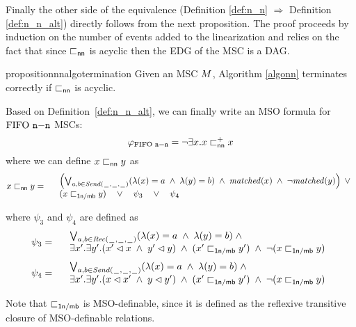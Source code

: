 Finally  the other side of the equivalence (Definition \ref{def:n_n} $\Rightarrow$ Definition \ref{def:n_n_alt}) directly follows from the next proposition. The proof  proceeds by induction on the number of events added to the linearization and relies on the fact that since $\sqsubset_{\mathsf{nn}}$ is acyclic then the EDG of the MSC is a DAG.

\begin{restatable}{proposition}{nnalgotermination}
\label{prop:nn_algo_term}
	Given an MSC $M$, Algorithm \ref{algonn}  terminates correctly if $\sqsubset_{\mathsf{nn}}$ is acyclic.
\end{restatable}

Based on Definition~\ref{def:n_n_alt}, we can finally write an MSO formula for $\text{FIFO } \mathtt{n\mathsf{-}n}$ MSCs:
\[
	\varphi_{\text{FIFO } \mathtt{n\mathsf{-}n}} = \neg \exists x. x \sqsubset_{\mathsf{nn}}^{+} x 
\]
where we can define $x \sqsubset_{\mathsf{nn}} y$ as
\[
	x \sqsubset_{\mathsf{nn}} y =
	\begin{array}{rl}
	& \left(
		\bigvee_{\substack{a,b \in {\mathit{Send}(\hspace{0.1em}\underline{\hspace{0.5em}}\hspace{0.1em},\hspace{0.1em}\underline{\hspace{0.5em}}\hspace{0.1em},\hspace{0.1em}\underline{\hspace{0.5em}}\hspace{0.1em})}}}
		(\lambda(x) = a \;\wedge\; \lambda(y) = b)
		\;\wedge\; \mathit{matched}(x) \;\wedge\; \neg \mathit{matched}(y)
	\right) \;\vee\\
	& (x \sqsubset_{\mathsf{1n/\mathsf{mb}}} y) \quad \vee \quad \psi_3 \quad \vee \quad \psi_4\\
	\end{array}
\]

\noindent where $\psi_3$ and $\psi_4$ are defined as
\[
	\psi_3 =
	\begin{array}{rl}
		& \bigvee_{\substack{a,b \in {\mathit{Rec}(\hspace{0.1em}\underline{\hspace{0.5em}}\hspace{0.1em},\hspace{0.1em}\underline{\hspace{0.5em}}\hspace{0.1em},\hspace{0.1em}\underline{\hspace{0.5em}}\hspace{0.1em})}}}
		  (\lambda(x) = a \;\wedge\; \lambda(y) = b)
		  \;\wedge\; \\
		& \exists x'.\exists y'.(x' \lhd x \;\wedge\; y' \lhd y) \;\wedge\; (x' \sqsubset_{\mathsf{1n/\mathsf{mb}}} y') \;\wedge\; \neg(x \sqsubset_{\mathsf{1n/\mathsf{mb}}} y)\\
	\end{array}
\]
\[
	\psi_4 =
	\begin{array}{rl}
		& \bigvee_{\substack{a,b \in {\mathit{Send}(\hspace{0.1em}\underline{\hspace{0.5em}}\hspace{0.1em},\hspace{0.1em}\underline{\hspace{0.5em}}\hspace{0.1em},\hspace{0.1em}\underline{\hspace{0.5em}}\hspace{0.1em})}}}
		  (\lambda(x) = a \;\wedge\; \lambda(y) = b)
		  \;\wedge\; \\
		& \exists x'.\exists y'.(x \lhd x' \;\wedge\; y \lhd y') \;\wedge\; (x' \sqsubset_{\mathsf{1n/\mathsf{mb}}} y') \;\wedge\; \neg(x \sqsubset_{\mathsf{1n/\mathsf{mb}}} y)\\
	\end{array}
\]

Note that $\sqsubset_{\mathsf{1n/\mathsf{mb}}}$ is MSO-definable, since it is defined as the reflexive transitive closure of MSO-definable relations.

